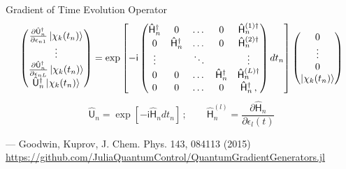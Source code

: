 \documentclass[compress, aspectratio=169]{beamer}
\newcommand{\Op}[1]{\ensuremath{\mathsf{\hat{#1}}}}
\newcommand{\ii}{\mathsf{i}}
\begin{document}
\begin{frame}{Gradient of Time Evolution Operator}
    \begin{equation*}%
      \begin{pmatrix}
        \frac{\partial \Op{U}^{\dagger}_n}{\partial \epsilon_{n1}} \ket{\chi_k(t_{n})} \\
          \vdots\\
          \frac{\partial \Op{U}^{\dagger}_n}{\partial \epsilon_{nL}} \ket{\chi_k(t_{n})} \\
          \Op{U}^{\dagger}_n \ket{\chi_k(t_{n})}
        \end{pmatrix}
      = \exp \left[-\ii \begin{pmatrix}
        \Op{H}^\dagger_n & 0 & \dots & 0 &\Op{H}_n^{(1)\dagger} \\
        0 & \Op{H}^\dagger_n & \dots & 0 & \Op{H}_n^{(2)\dagger} \\
        \vdots & & \ddots & & \vdots \\
        0 & 0 & \dots & \Op{H}^\dagger_n & \Op{H}_n^{(L)\dagger} \\
        0 & 0 & \dots & 0 & \Op{H}^\dagger_n\,,
      \end{pmatrix} dt_n\right]
      \begin{pmatrix} 0 \\ \vdots \\ 0 \\ \ket{\chi_k(t_n)} \end{pmatrix}
    \end{equation*}
    \vspace{5mm}
    \begin{equation*}
      \Op{U}_n = \exp[-\ii \Op{H}_n dt_n]\,;
      \qquad
      \Op{H}_n^{(l)} = \frac{\partial \Op{H}_n}{\partial \epsilon_l(t)}
    \end{equation*}
    \par
    \vspace{5mm}
    \hfill \footnotesize{--- Goodwin, Kuprov, J. Chem. Phys. 143, 084113 (2015)}\\
    \vspace{3mm}
    \hfill \footnotesize{\url{https://github.com/JuliaQuantumControl/QuantumGradientGenerators.jl}}
\end{frame}
\end{document}
